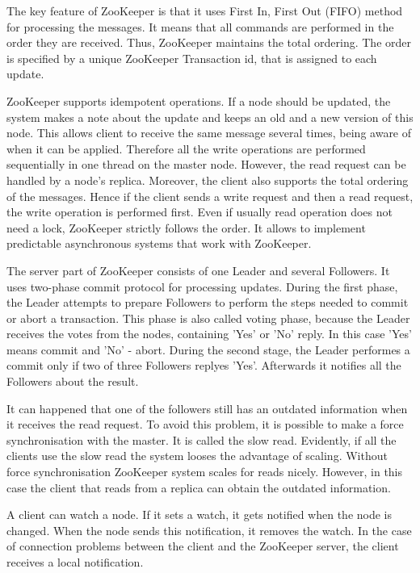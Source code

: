 The key feature of ZooKeeper is that it uses First In, First Out (FIFO) method for processing the messages.
It means that all commands are performed in the order they are received.
Thus, ZooKeeper maintains the total ordering.
The order is specified by a unique ZooKeeper Transaction id, that is assigned to each update.
 
ZooKeeper supports idempotent operations.
If a node should be updated, the system makes a note about the update and keeps an old and a new version of this node.
This allows client to receive the same message several times, being aware of when it can be applied.
Therefore all the write operations are performed sequentially in one thread on the master node.
However, the read request can be handled by a node's replica.
Moreover, the client also supports the total ordering of the messages.
Hence if the client sends a write request and then a read request, the write operation is performed first.
Even if usually read operation does not need a lock, ZooKeeper strictly follows the order.
It allows to implement predictable asynchronous systems that work with ZooKeeper.

The server part of ZooKeeper consists of one Leader and several Followers.
It uses two-phase commit protocol for processing updates.
During the first phase, the Leader attempts to prepare Followers to perform the steps needed to commit or abort a transaction.
This phase is also called voting phase, because the Leader receives the votes from the nodes, containing 'Yes' or 'No' reply.
In this case 'Yes' means commit and 'No' - abort.
During the second stage, the Leader performes a commit only if two of three Followers replyes 'Yes'.
Afterwards it notifies all the Followers about the result.

It can happened that one of the followers still has an outdated information when it receives the read request.
To avoid this problem, it is possible to make a force synchronisation with the master.
It is called the slow read.
Evidently, if all the clients use the slow read the system looses the advantage of scaling.
Without force synchronisation ZooKeeper system scales for reads nicely. 
However, in this case the client that reads from a replica can obtain the outdated information.

A client can watch a node.
If it sets a watch, it gets notified when the node is changed.
When the node sends this notification, it removes the watch.
In the case of connection problems between the client and the ZooKeeper server, the client receives a local notification.


